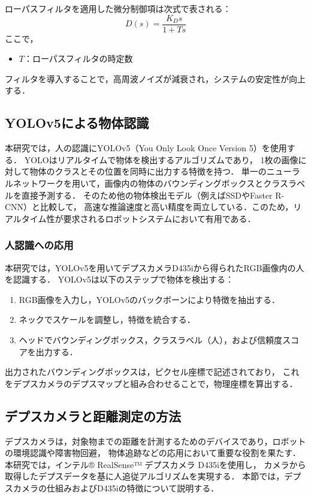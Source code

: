 ローパスフィルタを適用した微分制御項は次式で表される：
\begin{equation}
    D(s) = \frac{K_D s}{1 + T s}
    \label{eq:lowpass_filter}
\end{equation}
ここで，
\begin{itemize}
    \item $T$：ローパスフィルタの時定数
\end{itemize}

フィルタを導入することで，高周波ノイズが減衰され，システムの安定性が向上する．

\subsection{YOLOv5による物体認識}
本研究では，人の認識にYOLOv5（You Only Look Once Version 5）を使用する．
YOLOはリアルタイムで物体を検出するアルゴリズムであり，
1枚の画像に対して物体のクラスとその位置を同時に出力する特徴を持つ．
単一のニューラルネットワークを用いて，画像内の物体のバウンディングボックスとクラスラベルを直接予測する\cite{yolo}．
そのため他の物体検出モデル（例えばSSDやFaster R-CNN）と比較して，
高速な推論速度と高い精度を両立している．このため，リアルタイム性が要求されるロボットシステムにおいて有用である．

\subsubsection{人認識への応用}
本研究では，YOLOv5を用いてデプスカメラD435iから得られたRGB画像内の人を認識する．
YOLOv5は以下のステップで物体を検出する：
\begin{enumerate}
    \item RGB画像を入力し，YOLOv5のバックボーンにより特徴を抽出する．
    \item ネックでスケールを調整し，特徴を統合する．
    \item ヘッドでバウンディングボックス，クラスラベル（人），および信頼度スコアを出力する．
\end{enumerate}

出力されたバウンディングボックスは，ピクセル座標で記述されており，
これをデプスカメラのデプスマップと組み合わせることで，物理座標を算出する．


\subsection{デプスカメラと距離測定の方法}
デプスカメラは，対象物までの距離を計測するためのデバイスであり，ロボットの環境認識や障害物回避，
物体追跡などの応用において重要な役割を果たす．
本研究では，インテル® RealSense™ デプスカメラ D435iを使用し，
カメラから取得したデプスデータを基に人追従アルゴリズムを実現する．
本節では，デプスカメラの仕組みおよびD435iの特徴について説明する．

